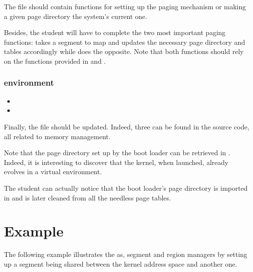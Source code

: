 The  file should contain functions for setting up the
paging mechanism or making a given page directory the system's current one.

Besides, the student will have to complete the two most important paging
functions:  takes a segment to map and
updates the necessary page directory and tables accordingly while
 does the opposite. Note that both
functions should rely on the functions provided in  and
.

\subsubsection*{environment}

\begin{itemize}
  \item
  \item
\end{itemize}

Finally, the  file should be updated. Indeed,
three  can be found in the source code, all related to memory
management.

Note that the page directory set up by the boot loader can be retrieved
in . Indeed, it is interesting to discover that the
kernel, when launched, already evolves in a virtual environment.

The student can actually notice that the boot loader's page directory is
imported in  and is later
cleaned from all the needless page tables.

%
%

\section{Example}

The following example illustrates the as, segment and region managers by
setting up a segment being shared between the kernel address space and
another one.

